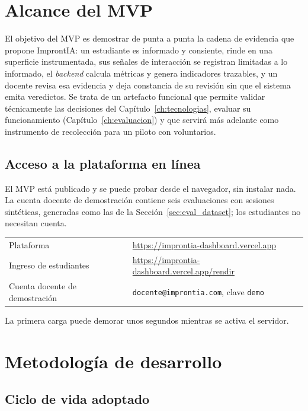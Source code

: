 \section{Alcance del MVP}
\label{sec:impl_alcance}

El objetivo del MVP es demostrar de punta a punta la cadena de evidencia que propone ImprontIA: un estudiante es informado y consiente, rinde en una superficie instrumentada, sus señales de interacción se registran limitadas a lo informado, el \textit{backend} calcula métricas y genera indicadores trazables, y un docente revisa esa evidencia y deja constancia de su revisión sin que el sistema emita veredictos. Se trata de un artefacto funcional que permite validar técnicamente las decisiones del Capítulo~\ref{ch:tecnologias}, evaluar su funcionamiento (Capítulo~\ref{ch:evaluacion}) y que servirá más adelante como instrumento de recolección para un piloto con voluntarios.

\subsection{Acceso a la plataforma en línea}
\label{sec:impl_acceso}

El MVP está publicado y se puede probar desde el navegador, sin instalar nada. La cuenta docente de demostración contiene seis evaluaciones con sesiones sintéticas, generadas como las de la Sección~\ref{sec:eval_dataset}; los estudiantes no necesitan cuenta.

\begin{center}
\small
\begin{tabular}{@{}ll@{}}
\toprule
Plataforma & \url{https://improntia-dashboard.vercel.app} \\
Ingreso de estudiantes & \url{https://improntia-dashboard.vercel.app/rendir} \\
Cuenta docente de demostración & \texttt{docente@improntia.com}, clave \texttt{demo} \\
\bottomrule
\end{tabular}
\end{center}

La primera carga puede demorar unos segundos mientras se activa el servidor.

\section{Metodología de desarrollo}
\label{sec:impl_metodologia}

\subsection{Ciclo de vida adoptado}

